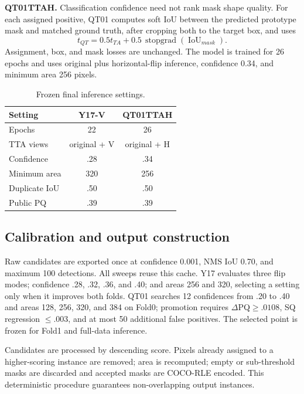 \documentclass[sigconf]{acmart}
\begin{document}
\textbf{QT01TTAH.} Classification confidence need not rank mask shape quality. For each assigned
positive, QT01 computes soft IoU between the predicted prototype mask and matched ground truth,
after cropping both to the target box, and uses
\begin{equation}
t_{QT}=0.5t_{TA}+0.5\,\operatorname{stopgrad}(\operatorname{IoU}_{mask}).
\end{equation}
Assignment, box, and mask losses are unchanged. The model is trained for 26 epochs and uses original
plus horizontal-flip inference, confidence 0.34, and minimum area 256 pixels.

\begin{table}[!h]
\centering
\caption{Frozen final inference settings.}
\label{tab:final-settings}
\small
\begin{tabular}{lcc}
\toprule
Setting & Y17-V & QT01TTAH \\
\midrule
Epochs & 22 & 26 \\
TTA views & original + V & original + H \\
Confidence & .28 & .34 \\
Minimum area & 320 & 256 \\
Duplicate IoU & .50 & .50 \\
Public PQ & .39 & .39 \\
\bottomrule
\end{tabular}
\end{table}

\subsection{Calibration and output construction}
Raw candidates are exported once at confidence 0.001, NMS IoU 0.70, and maximum 100 detections.
All sweeps reuse this cache. Y17 evaluates three flip modes; confidence .28, .32, .36, and .40; and
areas 256 and 320, selecting a setting only when it improves both folds. QT01 searches 12
confidences from .20 to .40 and areas 128, 256, 320, and 384 on Fold0; promotion requires
$\Delta$PQ$\geq.0108$, SQ regression $\leq.003$, and at most 50 additional false
positives. The selected point is frozen for Fold1 and full-data inference.

Candidates are processed by descending score. Pixels already assigned to a higher-scoring instance
are removed; area is recomputed; empty or sub-threshold masks are discarded and accepted masks are
COCO-RLE encoded. This deterministic procedure guarantees non-overlapping output instances.
\end{document}
